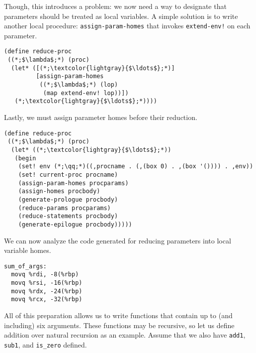 Though, this introduces a problem: we now need a way to designate that parameters should be treated as local variables. A simple solution is to write another local procedure: \texttt{assign-param-homes} that invokes \texttt{extend-env!} on each parameter.

\begin{cl}[]{}\begin{lstlisting}[language=MyScheme]
(define reduce-proc
 ((*;$\lambda$;*) (proc)
  (let* ([(*;\textcolor{lightgray}{$\ldots$};*)]
         [assign-param-homes 
          ((*;$\lambda$;*) (lop)
           (map extend-env! lop))])
   (*;\textcolor{lightgray}{$\ldots$};*))))
\end{lstlisting}\end{cl}

Lastly, we must assign parameter homes before their reduction.

\begin{cl}[]{}\begin{lstlisting}[language=MyScheme]
(define reduce-proc
 ((*;$\lambda$;*) (proc)
  (let* ((*;\textcolor{lightgray}{$\ldots$};*))
   (begin
    (set! env (*;\qq;*)((,procname . (,(box 0) . ,(box '()))) . ,env))
    (set! current-proc procname)
    (assign-param-homes procparams)
    (assign-homes procbody)
    (generate-prologue procbody)
    (reduce-params procparams)
    (reduce-statements procbody)
    (generate-epilogue procbody)))))
\end{lstlisting}\end{cl}

We can now analyze the code generated for reducing parameters into local variable homes.

\begin{cl}[]{}
\begin{lstlisting}[language=MyAssembly]
sum_of_args:
  movq %rdi, -8(%rbp)
  movq %rsi, -16(%rbp)
  movq %rdx, -24(%rbp)
  movq %rcx, -32(%rbp)
\end{lstlisting}
\end{cl}

All of this preparation allows us to write functions that contain up to (and including) six arguments. These functions may be recursive, so let us define addition over natural recursion as an example. Assume that we also have \texttt{add1}, \texttt{sub1}, and \texttt{is_zero} defined.

